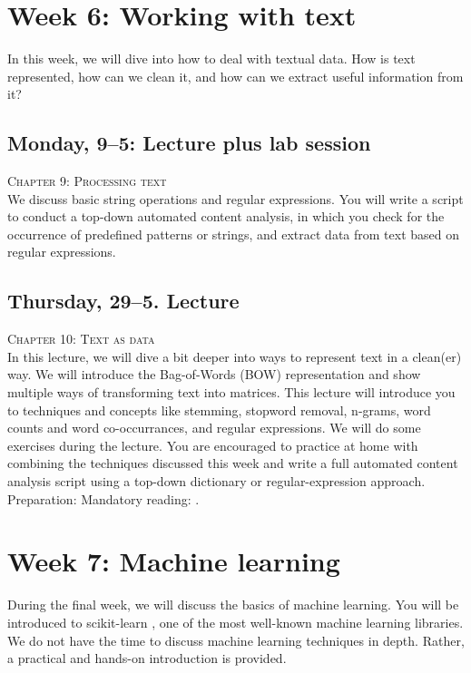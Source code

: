 \section*{Week 6: Working with text}

In this week, we will dive into how to deal with textual data. How is text represented, how can we clean it, and how can we extract useful information from it?

\subsection*{Monday, 9--5: Lecture plus lab session}
\textsc{ Chapter 9: Processing text}\\
We discuss basic string operations and regular expressions. You will write a script to conduct a top-down automated content analysis, in which you check for the occurrence of predefined patterns or strings, and extract data from text based on regular expressions.

\subsection*{Thursday, 29--5. Lecture}
\textsc{ Chapter 10: Text as data}\\
In this lecture, we will dive a bit deeper into ways to represent text in a clean(er) way. We will introduce the Bag-of-Words (BOW) representation and show multiple ways of transforming text into matrices. This lecture will introduce you to techniques and concepts like stemming, stopword removal, n-grams, word counts and word co-occurrances, and regular expressions. We will do some exercises during the lecture.
You are encouraged to practice at home with combining the techniques discussed this week and write a full automated content analysis script using a top-down dictionary or regular-expression approach.
Preparation: Mandatory reading: \cite{Boumans2016}.

\section*{Week 7: Machine learning}

During the final week, we will discuss the basics of machine learning. You will be introduced to scikit-learn \citep{scikit-learn}, one of the most well-known machine learning libraries. We do not have the time to discuss machine learning techniques in depth. Rather, a practical and hands-on introduction is provided. 

